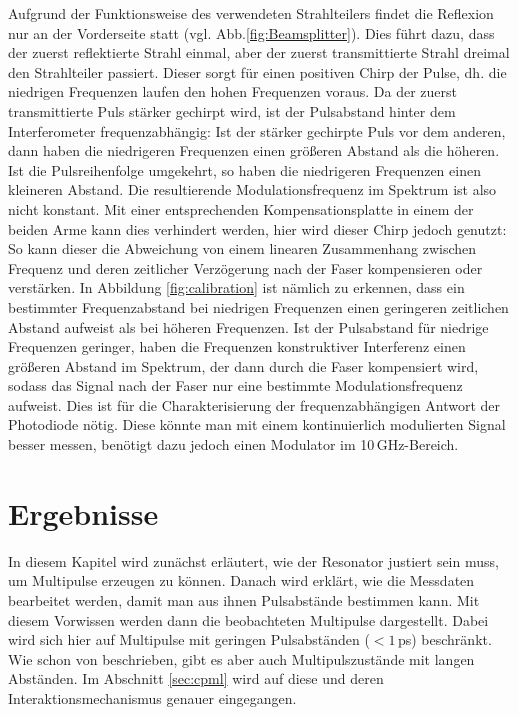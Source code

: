 \documentclass[bachelor,       %
               twoside,        %
               BCOR10mm,       %
               liststotoc,nomtotoc,bibtotoc, %
               english,ngerman, %
               final,          %
               ]{GAUBM}
\begin{document}
Aufgrund der Funktionsweise des verwendeten Strahlteilers findet die Reflexion nur an der Vorderseite statt (vgl. Abb.\ref{fig:Beamsplitter}).
Dies führt dazu, dass der zuerst reflektierte Strahl einmal, aber der zuerst transmittierte Strahl dreimal den Strahlteiler passiert.
Dieser sorgt für einen positiven Chirp der Pulse, dh. die niedrigen Frequenzen laufen den hohen Frequenzen voraus.
Da der zuerst transmittierte Puls stärker gechirpt wird, ist der Pulsabstand   hinter dem Interferometer frequenzabhängig: Ist der stärker gechirpte Puls vor dem anderen, dann haben die niedrigeren Frequenzen einen größeren Abstand als die höheren. Ist die Pulsreihenfolge umgekehrt, so haben die niedrigeren Frequenzen einen kleineren Abstand.
Die resultierende Modulationsfrequenz im Spektrum ist also nicht konstant.
Mit einer entsprechenden Kompensationsplatte in einem der beiden Arme kann dies verhindert werden, hier wird dieser Chirp jedoch genutzt:
So kann dieser die Abweichung von einem linearen Zusammenhang zwischen Frequenz und deren zeitlicher Verzögerung nach der Faser kompensieren oder verstärken.
In Abbildung \ref{fig:calibration} ist nämlich zu erkennen, dass ein bestimmter Frequenzabstand bei niedrigen Frequenzen einen geringeren zeitlichen Abstand aufweist als bei höheren Frequenzen.
Ist der Pulsabstand für niedrige Frequenzen geringer, haben die Frequenzen konstruktiver Interferenz einen größeren Abstand im Spektrum, der dann durch die Faser kompensiert wird, sodass das Signal nach der Faser nur eine bestimmte Modulationsfrequenz aufweist.
Dies ist für die Charakterisierung der frequenzabhängigen Antwort der Photodiode nötig.
Diese könnte man mit einem kontinuierlich modulierten Signal besser messen, benötigt dazu jedoch einen Modulator im 10\,GHz-Bereich.

\chapter{Ergebnisse}
In diesem Kapitel wird zunächst erläutert, wie der Resonator justiert sein muss, um Multipulse erzeugen zu können.
Danach wird erklärt, wie die Messdaten bearbeitet werden, damit man aus ihnen Pulsabstände bestimmen kann.
Mit diesem Vorwissen werden dann die beobachteten Multipulse dargestellt.
Dabei wird sich hier auf Multipulse mit geringen Pulsabständen ($< 1\,$ps) beschränkt.
Wie schon von \cite{lai_multiple_1997} beschrieben, gibt es aber auch Multipulszustände mit langen Abständen.
Im Abschnitt \ref{sec:cpml} wird auf diese und deren Interaktionsmechanismus genauer eingegangen.
\end{document}
